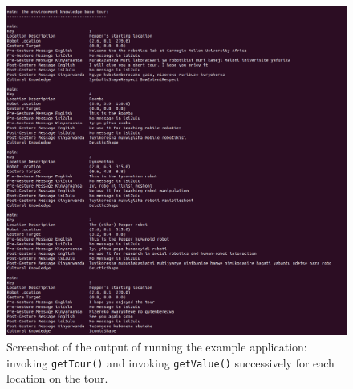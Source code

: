 \documentclass{CSSRforAfrica}
\begin{document}
\begin{figure}[H]
\begin{center}
\vspace{-5mm}
\includegraphics[width=\linewidth,angle=0]{screenshot2.png}
\end{center}
\vspace{-6mm}
\caption{Screenshot of  the output of running the example  application:  invoking {\small \tt getTour()} and invoking {\small \tt getValue()} successively for each location on the tour.}
\label{fig:screenshot2}       
\end{figure}
\end{document}
